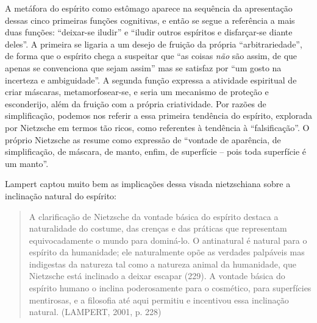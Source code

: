 \documentclass[
	12pt,				%
	openright,			%
	oneside,			%
	a4paper,			%
	english,			%
	french,				%
	spanish,			%
	brazil				%
	]{abntex2}
\begin{document}
A metáfora do espírito como estômago aparece na sequência da apresentação dessas cinco primeiras funções cognitivas, e então se segue a referência a mais duas funções: “deixar-se iludir” e “iludir outros espíritos e disfarçar-se diante deles”. A primeira se ligaria a um desejo de fruição da própria “arbitrariedade”, de forma que o espírito chega a suspeitar que “as coisas \textit{não} são assim, de que apenas se convenciona que sejam assim” mas se satisfaz por “um gosto na incerteza e ambiguidade”. A segunda função expressa a atividade espiritual de criar máscaras, metamorfosear-se, e seria um mecanismo de proteção e esconderijo, além da fruição com a própria criatividade. Por razões de simplificação, podemos nos referir a essa primeira tendência do espírito, explorada por Nietzsche em termos tão ricos, como referentes à tendência à “falsificação”. O próprio Nietzsche as resume como expressão de  “vontade de aparência, de simplificação, de máscara, de manto, enfim, de superfície – pois toda superfície é um manto”. 

	Lampert captou muito bem as implicações dessa visada nietzschiana sobre a inclinação natural do espírito:

\begin{quotation}
A clarificação de Nietzsche da vontade básica do espírito destaca a naturalidade do costume, das crenças e das práticas que representam equivocadamente o mundo para dominá-lo. O antinatural é natural para o espírito da humanidade; ele naturalmente opõe as verdades palpáveis mas indigestas da natureza tal como a natureza animal da humanidade, que Nietzsche está inclinado a deixar escapar (229). A vontade básica do espírito humano o inclina poderosamente para o cosmético, para superfícies mentirosas, e a filosofia até aqui permitiu e incentivou essa inclinação natural. (LAMPERT, 2001, p. 228)
\end{quotation}
\end{document}
